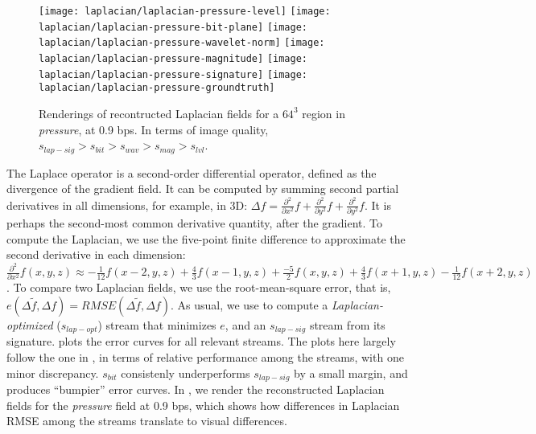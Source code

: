 \begin{figure}[h]
	\centering
	{\texttt{[image: laplacian/laplacian-pressure-level]}}
	{\texttt{[image: laplacian/laplacian-pressure-bit-plane]}}
	{\texttt{[image: laplacian/laplacian-pressure-wavelet-norm]}}
	{\texttt{[image: laplacian/laplacian-pressure-magnitude]}}
	{\texttt{[image: laplacian/laplacian-pressure-signature]}}
	{\texttt{[image: laplacian/laplacian-pressure-groundtruth]}}
	\caption{Renderings of recontructed Laplacian fields for a $64^3$ region in \emph{pressure}, at 0.9 bps.
	In terms of image quality, $s_{lap-sig} > s_{bit} > s_{wav} > s_{mag} > s_{lvl}$.}
	\label{fig:laplacian-renderings}
\end{figure}

The Laplace operator is a second-order differential operator, defined as the divergence of the
gradient field. It can be computed by summing second partial derivatives in all dimensions, for
example, in 3D: $\Delta
f=\frac{{\partial}^2}{\partial{x^2}}f+\frac{{\partial}^2}{\partial{y^2}}f+\frac{{\partial}^2}{\partial{y^2}}f$.
It is perhaps the second-most common derivative quantity, after the gradient. To compute the
Laplacian, we use the five-point finite difference to approximate the second derivative in each
dimension: $\frac{{\partial}^2}{\partial{x^2}}f(x,y,z) \approx
-\frac{1}{12}f(x-2,y,z)+\frac{4}{3}f(x-1,y,z)+\frac{-5}{2}f(x,y,z)+\frac{4}{3}f(x+1,y,z)-\frac{1}{12}f(x+2,y,z)$.
To compare two Laplacian fields, we use the root-mean-square error, that is, $e(\Delta
\tilde{f},\Delta f)=RMSE(\Delta \tilde{f},\Delta f)$. As usual, we use 
to compute a \emph{Laplacian-optimized} ($s_{lap-opt}$) stream that minimizes $e$, and an
$s_{lap-sig}$ stream from its signature.  plots the error
curves for all relevant streams. The plots here largely follow the one in
, in terms of relative performance among the streams, with one
minor discrepancy. $s_{bit}$ consistenly underperforms $s_{lap-sig}$ by a small margin, and produces
``bumpier'' error curves. In , we render the reconstructed Laplacian
fields for the \emph{pressure} field at 0.9 bps, which shows how differences in Laplacian RMSE among
the streams translate to visual differences.
